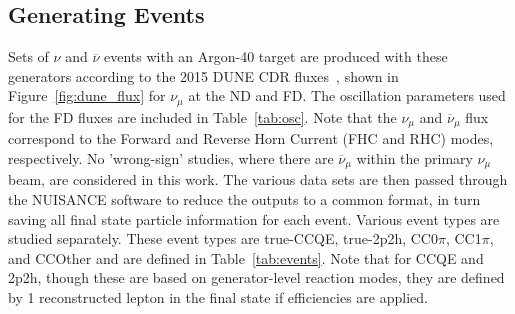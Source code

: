 \documentclass[12pt]{article}
\begin{document}
\subsection{Generating Events}
\label{subsec:events}
Sets of $\nu$ and $\overline{\nu}$ events with an Argon-40 target are produced with these generators according to the 2015 DUNE CDR fluxes~\cite{DUNE_osc}, shown in Figure~\ref{fig:dune_flux} for $\nu_{\mu}$ at the ND and FD. The oscillation parameters used for the FD fluxes are included in Table~\ref{tab:osc}. Note that the $\nu_\mu$ and $\overline{\nu}_\mu$ flux correspond to the Forward and Reverse Horn Current (FHC and RHC) modes, respectively. No 'wrong-sign' studies, where there are $\overline{\nu}_\mu$ within the primary $\nu_\mu$ beam, are considered in this work. The various data sets are then passed through the NUISANCE\cite{NUISANCE} software to reduce the outputs to a common format, in turn saving all final state particle information for each event. Various event types are studied separately. These event types are true-CCQE, true-2p2h, CC0$\pi$, CC1$\pi$, and CCOther and are defined in Table~\ref{tab:events}. Note that for CCQE and 2p2h, though these are based on generator-level reaction modes, they are defined by 1 reconstructed lepton in the final state if  efficiencies are applied.
\end{document}
